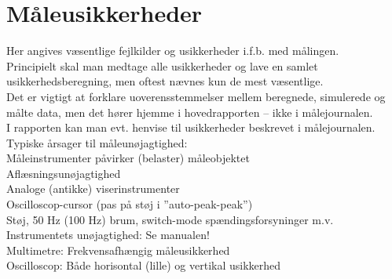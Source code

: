 \section{Måleusikkerheder}
\label{maalejournal_maaleusikkerheder}
Her angives væsentlige fejlkilder og usikkerheder i.f.b. med målingen. \\
Principielt skal man medtage alle usikkerheder og lave en samlet usikkerhedsberegning, men oftest nævnes kun de mest væsentlige. \\
Det er vigtigt at forklare uoverensstemmelser mellem beregnede, simulerede og målte data, men det hører hjemme i hovedrapporten – ikke i målejournalen. \\
I rapporten kan man evt. henvise til usikkerheder beskrevet i målejournalen.\\
Typiske årsager til måleunøjagtighed:\\
Måleinstrumenter påvirker (belaster) måleobjektet\\
Aflæsningsunøjagtighed\\
Analoge (antikke) viserinstrumenter	\\
Oscilloscop-cursor (pas på støj i ”auto-peak-peak”)\\
Støj, 50 Hz (100 Hz) brum, switch-mode spændingsforsyninger m.v.\\
Instrumentets unøjagtighed: Se manualen! \\
Multimetre: Frekvensafhængig måleusikkerhed \\
Oscilloscop: Både horisontal (lille) og vertikal usikkerhed\\


